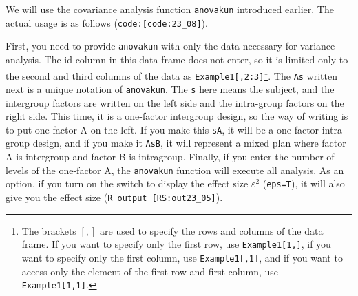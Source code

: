 \documentclass{ltjbook}
\begin{document}
We will use the covariance analysis function \texttt{anovakun} introduced earlier. The actual usage is as follows (\texttt{code:\ref{code:23_08}}).


First, you need to provide \texttt{anovakun} with only the data necessary for variance analysis. The id column in this data frame does not enter, so it is limited only to the second and third columns of the data as \texttt{Example1[,2:3]}\footnote{The brackets $\left[, \right]$ are used to specify the rows and columns of the data frame. If you want to specify only the first row, use \texttt{Example1[1,]}, if you want to specify only the first column, use \texttt{Example1[,1]}, and if you want to access only the element of the first row and first column, use \texttt{Example1[1,1]}.}. The \texttt{As} written next is a unique notation of \texttt{anovakun}. The \texttt{s} here means the subject, and the intergroup factors are written on the left side and the intra-group factors on the right side. This time, it is a one-factor intergroup design, so the way of writing is to put one factor A on the left. If you make this \texttt{sA}, it will be a one-factor intra-group design, and if you make it \texttt{AsB}, it will represent a mixed plan where factor A is intergroup and factor B is intragroup. Finally, if you enter the number of levels of the one-factor A, the \texttt{anovakun} function will execute all analysis. As an option, if you turn on the switch to display the effect size $\varepsilon^2$ (\texttt{eps=T}), it will also give you the effect size (\texttt{R output \ref{RS:out23_05}}).
\end{document}
